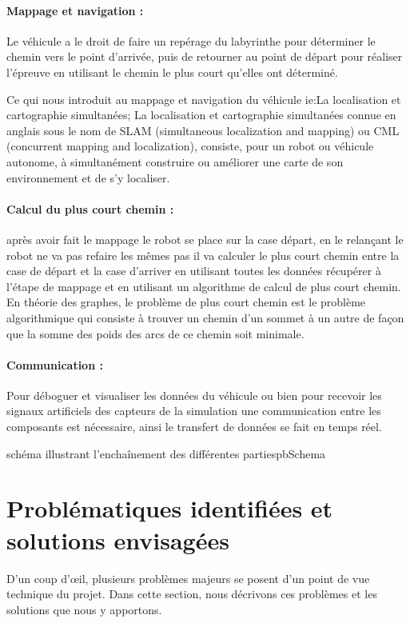 \paragraph{Mappage et navigation :} Le véhicule a le droit de faire un repérage du labyrinthe 
pour déterminer le chemin vers le point d'arrivée, puis de retourner au point de départ pour 
réaliser l'épreuve en utilisant le chemin le plus court qu'elles ont déterminé.

Ce qui nous introduit au mappage et navigation du véhicule ie:La localisation 
et cartographie simultanées; La localisation et cartographie simultanées connue en 
anglais sous le nom de SLAM (simultaneous localization and mapping) ou CML (concurrent mapping 
and localization), consiste, pour un robot ou véhicule autonome, à simultanément construire ou 
améliorer une carte de son environnement et de s’y localiser.

\paragraph{Calcul du plus court chemin :}après avoir fait le mappage le robot se place sur la 
case départ, en le relançant le robot ne va pas refaire les mêmes pas il va calculer le plus court 
chemin entre la case de départ et la case d'arriver en utilisant toutes les données récupérer à 
l'étape de mappage et en utilisant un algorithme de calcul de plus court chemin. \\

   En théorie des graphes, le problème de plus court chemin est le problème algorithmique qui 
consiste à trouver un chemin d'un sommet à un autre de façon que la somme des poids des arcs de ce chemin soit minimale. \\

\paragraph{Communication :}Pour déboguer et visualiser les données du véhicule ou bien pour recevoir les signaux artificiels des capteurs de la simulation une communication entre les composants est nécessaire, ainsi le transfert de données se fait en temps réel.

{schéma illustrant l’enchaînement des différentes parties}{pbSchema}

\section{Problématiques identifiées et solutions envisagées} \label{sec:problemesSolutions}
   D'un coup d'œil, plusieurs problèmes majeurs se posent d'un point de vue
technique du projet.  Dans cette section, nous décrivons ces problèmes et
les solutions que nous y apportons.



